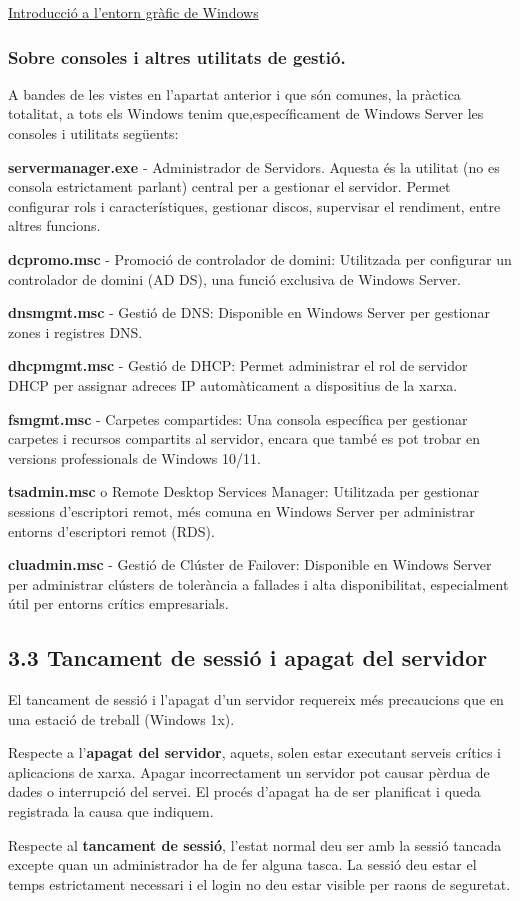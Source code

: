 \documentclass[
  a4paper,
]{article}
\begin{document}
\href{https://tofermos.github.io/Windows11/interfaces/interfaces.html}{Introducció
a l'entorn gràfic de Windows}

\subsubsection{Sobre consoles i altres utilitats de
gestió.}\label{sobre-consoles-i-altres-utilitats-de-gestiuxf3.}

A bandes de les vistes en l'apartat anterior i que són comunes, la
pràctica totalitat, a tots els Windows tenim que,específicament de
Windows Server les consoles i utilitats següents:

\textbf{servermanager.exe} - Administrador de Servidors. Aquesta és la
utilitat (no es consola estrictament parlant) central per a gestionar el
servidor. Permet configurar rols i característiques, gestionar discos,
supervisar el rendiment, entre altres funcions.

\textbf{dcpromo.msc} - Promoció de controlador de domini: Utilitzada per
configurar un controlador de domini (AD DS), una funció exclusiva de
Windows Server.

\textbf{dnsmgmt.msc} - Gestió de DNS: Disponible en Windows Server per
gestionar zones i registres DNS.

\textbf{dhcpmgmt.msc} - Gestió de DHCP: Permet administrar el rol de
servidor DHCP per assignar adreces IP automàticament a dispositius de la
xarxa.

\textbf{fsmgmt.msc} - Carpetes compartides: Una consola específica per
gestionar carpetes i recursos compartits al servidor, encara que també
es pot trobar en versions professionals de Windows 10/11.

\textbf{tsadmin.msc} o Remote Desktop Services Manager: Utilitzada per
gestionar sessions d'escriptori remot, més comuna en Windows Server per
administrar entorns d'escriptori remot (RDS).

\textbf{cluadmin.msc} - Gestió de Clúster de Failover: Disponible en
Windows Server per administrar clústers de tolerància a fallades i alta
disponibilitat, especialment útil per entorns crítics empresarials.

\subsection{3.3 Tancament de sessió i apagat del
servidor}\label{tancament-de-sessiuxf3-i-apagat-del-servidor}

El tancament de sessió i l'apagat d'un servidor requereix més
precaucions que en una estació de treball (Windows 1x).

Respecte a l'\textbf{apagat del servidor}, aquets, solen estar executant
serveis crítics i aplicacions de xarxa. Apagar incorrectament un
servidor pot causar pèrdua de dades o interrupció del servei. El procés
d'apagat ha de ser planificat i queda registrada la causa que indiquem.

Respecte al \textbf{tancament de sessió}, l'estat normal deu ser amb la
sessió tancada excepte quan un administrador ha de fer alguna tasca. La
sessió deu estar el temps estrictament necessari i el login no deu estar
visible per raons de seguretat.
\end{document}
